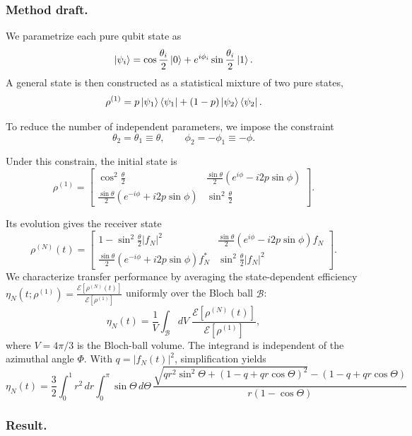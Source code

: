 \documentclass[../../../main.tex]{subfiles}
\begin{document}
\subsubsection{Method draft.}
We parametrize each pure qubit state as
\[
\ket{\psi_i}
=\cos\frac{\theta_i}{2}\ket{0}
+e^{i\phi_i}\sin\frac{\theta_i}{2}\ket{1}.
\]
A general state is then constructed as a statistical mixture of two pure states,
\[
\rho^{(1)}
=p\ket{\psi_1}\bra{\psi_1}
+(1-p)\ket{\psi_2}\bra{\psi_2}.
\]

To reduce the number of independent parameters, we impose the constraint
\[
\theta_2=\theta_1\equiv\theta,
\qquad
\phi_2=-\phi_1\equiv-\phi.
\]

  Under this constrain, the initial state is
  \[
    \rho^{(1)}=
    \begin{bmatrix}
      \cos^2\frac{\theta}{2}
      & \frac{\sin\theta}{2}
        \left(e^{i\phi}-i2p\sin\phi\right)\\[2mm]
      \frac{\sin\theta}{2}
        \left(e^{-i\phi}+i2p\sin\phi\right)
      & \sin^2\frac{\theta}{2}
    \end{bmatrix}.
  \]

  Its evolution gives the receiver state
  \[
    \rho^{(N)}(t)=
    \begin{bmatrix}
      1-\sin^2\frac{\theta}{2}|f_N|^2
      & \frac{\sin\theta}{2}
        \left(e^{i\phi}-i2p\sin\phi\right)f_N\\[2mm]
      \frac{\sin\theta}{2}
        \left(e^{-i\phi}+i2p\sin\phi\right)f_N^*
      & \sin^2\frac{\theta}{2}|f_N|^2
    \end{bmatrix}.
  \]
        We characterize transfer performance by averaging the state-dependent efficiency $\eta_N(t;\rho^{(1)})=\frac{\mathcal E[\rho^{(N)}(t)]}{\mathcal E[\rho^{(1)}]}$ uniformly over the Bloch ball $\mathcal B$:
      \[
        \eta_N(t)
        =\frac{1}{V}\int_{\mathcal B}
        dV\;\frac{\mathcal E[\rho^{(N)}(t)]}{\mathcal E[\rho^{(1)}]},
      \]
      where $V=4\pi/3$ is the Bloch-ball volume.
  The integrand is independent of the azimuthal angle $\Phi$.
  With $q = |f_N(t)|^2$, simplification yields
\begin{equation*}
      \eta_N(t)=\frac{3}{2}\int_0^1 r^2\,dr
    \int_0^\pi \sin\Theta\,d\Theta\,
    \frac{
      \sqrt{qr^2\sin^2\Theta+(1-q+qr\cos\Theta)^2}
      -(1-q+qr\cos\Theta)}
    {r(1-\cos\Theta)}
\end{equation*}

\subsubsection{Result.}
\end{document}
